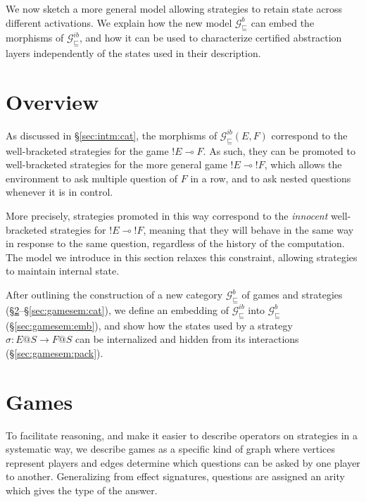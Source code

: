 \documentclass[draft,11pt]{report}
\newcommand{\gcat}{\mathcal{G}_{\sqsubseteq}}
\begin{document}
We now sketch a more general model
allowing strategies to retain state
across different activations.
We explain how the new model $\gcat^b$ can embed
the morphisms of $\gcat^{ib}$,
and how it can be used to characterize
certified abstraction layers
independently of the states used in their description.

\section{Overview} %
\label{sec:arrow}

As discussed in \S\ref{sec:intm:cat},
the morphisms of $\gcat^{ib}(E, F)$
correspond to the well-bracketed strategies
for the game ${!E} \multimap F$.
As such, they can be promoted to well-bracketed strategies for
the more general game ${!E} \multimap {!F}$,
which allows the environment to ask
multiple question of $F$ in a row,
and to ask nested questions
whenever it is in control.

More precisely,
strategies promoted in this way
correspond to the \emph{innocent} well-bracketed strategies for
${!E} \multimap {!F}$,
meaning that they will behave in the same way
in response to the same question,
regardless of the history of the computation.
The model we introduce in this section
relaxes this constraint,
allowing strategies to maintain internal state.

After outlining the construction of a new category $\gcat^b$
of games and strategies
(\S\ref{sec:gamesem:games}--\S\ref{sec:gamesem:cat}),
we define an embedding of
$\gcat^{ib}$ into $\gcat^b$
(\S\ref{sec:gamesem:emb}),
and show how the states used by a strategy
$\sigma : E@S \rightarrow F@S$
can be internalized and
hidden from its interactions
(\S\ref{sec:gamesem:pack}).


\section{Games} \label{sec:gamesem:games} %

To facilitate reasoning,
and make it easier to describe operators on strategies
in a systematic way,
we describe games as a specific kind of graph
where vertices represent players
and edges determine which questions can be asked
by one player to another.
Generalizing from effect signatures,
questions are assigned an arity
which gives the type of the answer.
\end{document}
